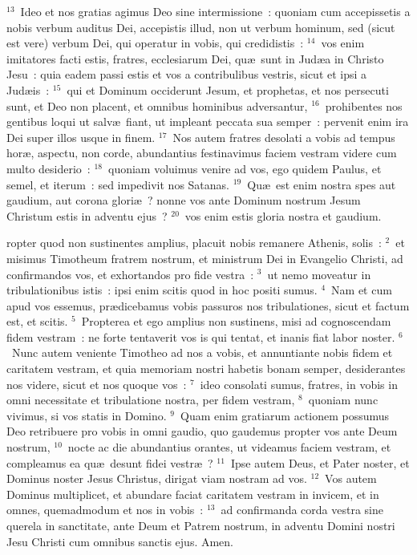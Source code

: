 ${}^{13}$~Ideo et nos gratias agimus Deo sine intermissione~: quoniam cum accepissetis a nobis verbum auditus Dei, accepistis illud, non ut verbum hominum, sed (sicut est vere) verbum Dei, qui operatur in vobis, qui credidistis~:
${}^{14}$~vos enim imitatores facti estis, fratres, ecclesiarum Dei, qu\ae\ sunt in Jud\ae a in Christo Jesu~: quia eadem passi estis et vos a contribulibus vestris, sicut et ipsi a Jud\ae is~:
${}^{15}$~qui et Dominum occiderunt Jesum, et prophetas, et nos persecuti sunt, et Deo non placent, et omnibus hominibus adversantur,
${}^{16}$~prohibentes nos gentibus loqui ut salv\ae\ fiant, ut impleant peccata sua semper~: pervenit enim ira Dei super illos usque in finem.
${}^{17}$~Nos autem fratres desolati a vobis ad tempus hor\ae , aspectu, non corde, abundantius festinavimus faciem vestram videre cum multo desiderio~:
${}^{18}$~quoniam voluimus venire ad vos, ego quidem Paulus, et semel, et iterum~: sed impedivit nos Satanas.
${}^{19}$~Qu\ae\ est enim nostra spes aut gaudium, aut corona glori\ae~? nonne vos ante Dominum nostrum Jesum Christum estis in adventu ejus~?
${}^{20}$~vos enim estis gloria nostra et gaudium.

\bchapter
{}ropter quod non sustinentes amplius, placuit nobis remanere Athenis, solis~:
${}^{2}$~et misimus Timotheum fratrem nostrum, et ministrum Dei in Evangelio Christi, ad confirmandos vos, et exhortandos pro fide vestra~:
${}^{3}$~ut nemo moveatur in tribulationibus istis~: ipsi enim scitis quod in hoc positi sumus.
${}^{4}$~Nam et cum apud vos essemus, pr\ae dicebamus vobis passuros nos tribulationes, sicut et factum est, et scitis.
${}^{5}$~Propterea et ego amplius non sustinens, misi ad cognoscendam fidem vestram~: ne forte tentaverit vos is qui tentat, et inanis fiat labor noster.
${}^{6}$~Nunc autem veniente Timotheo ad nos a vobis, et annuntiante nobis fidem et caritatem vestram, et quia memoriam nostri habetis bonam semper, desiderantes nos videre, sicut et nos quoque vos~:
${}^{7}$~ideo consolati sumus, fratres, in vobis in omni necessitate et tribulatione nostra, per fidem vestram,
${}^{8}$~quoniam nunc vivimus, si vos statis in Domino.
${}^{9}$~Quam enim gratiarum actionem possumus Deo retribuere pro vobis in omni gaudio, quo gaudemus propter vos ante Deum nostrum,
${}^{10}$~nocte ac die abundantius orantes, ut videamus faciem vestram, et compleamus ea qu\ae\ desunt fidei vestr\ae~?
${}^{11}$~Ipse autem Deus, et Pater noster, et Dominus noster Jesus Christus, dirigat viam nostram ad vos.
${}^{12}$~Vos autem Dominus multiplicet, et abundare faciat caritatem vestram in invicem, et in omnes, quemadmodum et nos in vobis~:
${}^{13}$~ad confirmanda corda vestra sine querela in sanctitate, ante Deum et Patrem nostrum, in adventu Domini nostri Jesu Christi cum omnibus sanctis ejus. Amen.

